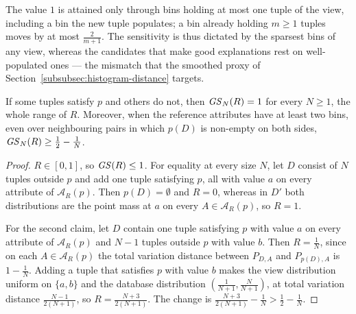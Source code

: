 The value $1$ is attained only through bins holding at most one tuple of the view, including a bin the new tuple populates; a bin already holding $m\ge1$ tuples moves by at most $\tfrac2{m+1}$.
The sensitivity is thus dictated by the sparsest bins of any view, whereas the candidates that make good explanations rest on well-populated ones --- the mismatch that the smoothed proxy of Section~\ref{subsubsec:histogram-distance} targets.

\begin{lemma}[Representativeness]
\label{lem:ideal-representativeness}
If some tuples satisfy $p$ and others do not, then $\mathit{GS}_N(R)=1$ for every $N\ge1$, the whole range of $R$.
Moreover, when the reference attributes have at least two bins, even over neighbouring pairs in which $p(D)$ is non-empty on both sides, $\mathit{GS}_N(R)\ge\tfrac12-\tfrac1N$.
\end{lemma}

\begin{proof}
$R\in[0,1]$, so $\mathit{GS}(R)\le1$.
For equality at every size $N$, let $D$ consist of $N$ tuples outside $p$ and add one tuple satisfying $p$, all with value $a$ on every attribute of $\mathcal{A}_R(p)$.
Then $p(D)=\emptyset$ and $R=0$, whereas in $D'$ both distributions are the point mass at $a$ on every $A\in\mathcal{A}_R(p)$, so $R=1$.

For the second claim, let $D$ contain one tuple satisfying $p$ with value $a$ on every attribute of $\mathcal{A}_R(p)$ and $N-1$ tuples outside $p$ with value $b$.
Then $R=\tfrac1N$, since on each $A\in\mathcal{A}_R(p)$ the total variation distance between $P_{D,A}$ and $P_{p(D),A}$ is $1-\tfrac1N$.
Adding a tuple that satisfies $p$ with value $b$ makes the view distribution uniform on $\{a,b\}$ and the database distribution $(\tfrac1{N+1},\tfrac{N}{N+1})$, at total variation distance $\tfrac{N-1}{2(N+1)}$, so $R=\tfrac{N+3}{2(N+1)}$.
The change is $\tfrac{N+3}{2(N+1)}-\tfrac1N>\tfrac12-\tfrac1N$.
\end{proof}

